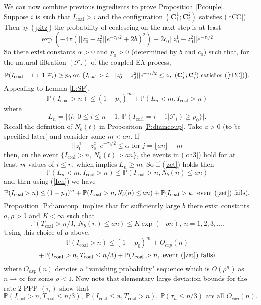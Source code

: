 \documentclass[12pt]{article}
\newcommand{\FF}{\mbox{${\mathcal F}$}}
\newcommand{\bC}{{\mathbf C}}
\renewcommand{\Pr}{{\mathbb P}}
\newcommand{\Tcouple}{T_{\mathrm{coal}}}
\newcommand{\Icouple}{I_{\mathrm{coal}}}
\newcommand{\Oexp}{O_{\scriptscriptstyle exp}}
\begin{document}
We can now combine previous ingredients to prove Proposition \ref{Pcouple}.
Suppose $i$ is such that 
$\Icouple > i$ and the configuration 
$(\bC^1_i; \bC^2_i)$ satisfies (\ref{tCC}). 
Then by (\ref{pitz}) the probability of coalescing on the next step is 
at least
\[
\exp(- 4\pi  (|| z^1_0 - z^2_0 || e^{-\tau_i /2} +2 b)^2)
- 2c_0 || z^1_0 - z^2_0 || e^{-\tau_i /2}  .
\]
So there exist constants $\alpha > 0$ and $p_0 > 0$  
(determined by $b$ and $c_0$) such that, for the natural 
filtration $(\FF_i)$ of the coupled EA process,
\begin{equation}
 \Pr(\Icouple = i+1 \vert \FF_i) \ge p_0 
\mbox{ on } 
\{ \Icouple > i, \ || z^1_0 - z^2_0 || e^{-\tau_i /2} \le \alpha, 
\mbox{ $(\bC^1_i; \bC^2_i)$ satisfies (\ref{tCC})}
 \}
. \label{on3}
\end{equation}
Appealing to Lemma \ref{L:SF},
\begin{equation}
 \Pr(\Icouple > n) \le (1-p_0)^m + \Pr( L_n < m, \Icouple > n) 
 \label{Icn}
 \end{equation}
where
\[ L_n = \vert \{i: \ 0 \le i \le n-1, \ \Pr(\Icouple =i+1|\FF_{i})  \ge p_0 \} \vert .\]
Recall the definition of $N_b(t)$ in Proposition \ref{P:diamcoup}.
Take $a > 0$ (to be specified later) and consider some $m < an$.
If
\begin{equation}
 || z^1_0 - z^2_0 || e^{-\tau_j /2} \le \alpha \mbox{ for } 
j =  \lfloor an \rfloor - m 
\label{zet}
\end{equation}
then, on the event  $\{  \Icouple > n, \ N_b(t) > an \}$, the events in (\ref{on3}) hold for at least 
$m$ values of $i \le n$, which implies $L_n \ge m$.
So if (\ref{zet}) holds then
\[ \Pr(L_n < m, \Icouple > n) \le \Pr( \Icouple > n, N_b(n) \le an)  \]
and then using (\ref{Icn}) we have
\[  \Pr(\Icouple > n) \le (1-p_0)^m + \Pr( \Icouple > n, N_b(n) \le an) + 
 \Pr(\Icouple > n,  \mbox{ event (\ref{zet}) fails}) 
. \]
Proposition \ref{P:diamcoup} implies that
for sufficiently large $b$ there exist  constants $a, \rho > 0$ and $K< \infty$ such that
\[ \Pr(\Tcouple > n/3, \ N_b(n) \le an) \le K \exp(-\rho n), \ n = 1, 2, 3, \ldots  .\]
Using this choice of $a$ above, 
\[  \Pr(\Icouple > n) \le (1-p_0)^m + 
 \Oexp(n) 
\] \[
+   \Pr( \Icouple > n,   \Tcouple \le n/3)  + \Pr(\Icouple > n,  \mbox{ event (\ref{zet}) fails}) 
 \]
 where $\Oexp(n)$ denotes a ``vanishing probability" sequence which is $O( \rho^n)$ as $n \to \infty$ for some $\rho < 1$. 
 Now  note that elementary large deviation bounds for the rate-$2$ PPP $(\tau_i)$ show that 
 \begin{equation}
 \Pr( \Icouple > n,   \Tcouple \le n/3), \  \Pr( \Icouple \le  n,   \Tcouple > n), \ \Pr(\tau_n \le n/3) 
 \mbox{ are all } \Oexp(n).
 \label{eq41}
 \end{equation}
\end{document}
